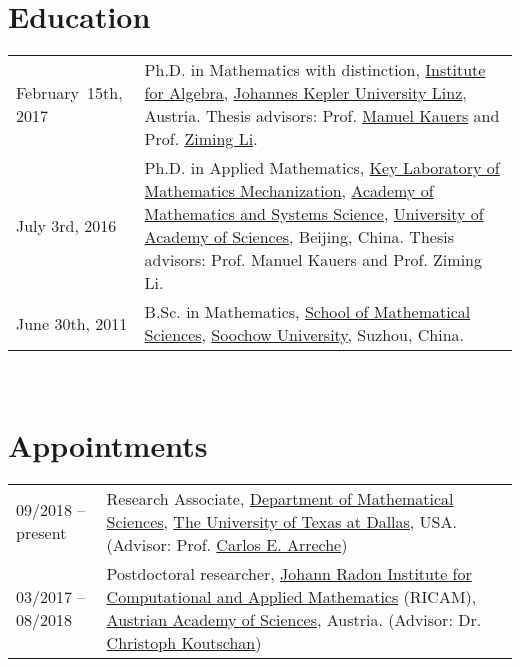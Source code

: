\documentclass[a4paper,12pt]{article}
\begin{document}

\section*{\Large{Education}}
\begin{tabular}{@{}p{1.5in}p{4in}}
February~15th, 2017   &  Ph.D. in Mathematics with distinction, 
                        \href{http://www.jku.at/algebra/content}{Institute for Algebra}, 
                        \href{http://www.jku.at/content}{Johannes Kepler University Linz}, Austria. 
                        Thesis advisors: Prof. \href{http://www.kauers.de/}{Manuel Kauers} and 
                        Prof. \href{http://mmrc.iss.ac.cn/~zmli/}{Ziming Li}. \\
July 3rd, 2016    & Ph.D. in Applied Mathematics, 
                        \href{http://english.mmrc.amss.cas.cn/}{Key Laboratory of Mathematics Mechanization}, 
                        \href{http://english.amss.cas.cn/}{Academy of Mathematics and Systems Science}, 
                        \href{http://english.ucas.ac.cn/}{University of Academy of Sciences}, Beijing, China. 
                       Thesis advisors: Prof. Manuel Kauers and Prof. Ziming Li.\\
June 30th, 2011    & B.Sc. in Mathematics, \href{http://math.suda.edu.cn/}{School of Mathematical Sciences}, 
                        \href{http://eng.suda.edu.cn/}{Soochow University}, Suzhou, China.  
\end{tabular} \\

\section*{\Large{Appointments}}
\begin{tabular}{@{}p{1.4in}p{4in}}
09/2018 -- present      & Research Associate, \href{https://www.utdallas.edu/math/}{Department of Mathematical Sciences}, 
                        \href{https://www.utdallas.edu/}{The University of Texas at Dallas}, USA. 
                        (Advisor: Prof. \href{https://www.utdallas.edu/~arreche/}{Carlos E. Arreche}) \\    
03/2017 -- 08/2018    & Postdoctoral researcher, 
                        \href{https://www.ricam.oeaw.ac.at/}{Johann Radon Institute for Computational and Applied Mathematics} (RICAM),
                        \href{http://www.oeaw.ac.at/en/austrian-academy-of-sciences/}{Austrian Academy of Sciences}, Austria. 
                        (Advisor: Dr. \href{http://www.koutschan.de/}{Christoph Koutschan})\\
\end{tabular}
\end{document}
